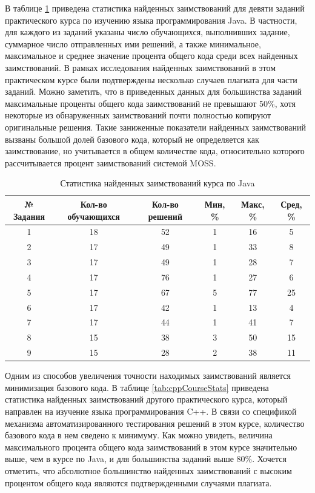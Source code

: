 \documentclass[a4paper,14pt]{extarticle}
\begin{document}
В таблице \ref{tab:javaCourseStats} приведена статистика найденных заимствований для девяти заданий практического курса по изучению языка программирования Java. В частности, для каждого из заданий указаны число обучающихся, выполнивших задание, суммарное число отправленных ими решений, а также минимальное, максимальное и среднее значение процента общего кода среди всех найденных заимствований. В рамках исследования найденных заимствований в этом практическом курсе были подтверждены несколько случаев плагиата для части заданий. Можно заметить, что в приведенных данных для большинства заданий максимальные проценты общего кода заимствований не превышают 50\%, хотя некоторые из обнаруженных заимствований почти полностью копируют оригинальные решения. Такие заниженные показатели найденных заимствований вызваны большой долей базового кода, который не определяется как заимствование, но учитывается в общем количестве кода, относительно которого рассчитывается процент заимствований системой MOSS.

\begin{table}[htb]
    \centering
    \begin{tabular}{cccccc}
        \toprule
        № Задания & Кол-во обучающихся & Кол-во решений & Мин, \% & Макс, \% & Сред, \% \\
        \toprule
        1 & 18 & 52 & 1 & 16 & 5 \\
        \midrule
        2 & 17 & 49 & 1 & 33 & 8 \\
        \midrule
        3 & 17 & 49 & 1 & 28 & 7 \\
        \midrule
        4 & 17 & 76 & 1 & 27 & 6 \\
        \midrule
        5 & 17 & 67 & 5 & 77 & 25 \\
        \midrule
        6 & 17 & 42 & 1 & 13 & 4 \\
        \midrule
        7 & 17 & 44 & 1 & 41 & 7 \\
        \midrule
        8 & 15 & 38 & 3 & 50 & 15 \\
        \midrule
        9 & 15 & 28 & 2 & 38 & 11 \\
        \bottomrule
    \end{tabular}
    \caption{Статистика найденных заимствований курса по Java}
    \label{tab:javaCourseStats}
\end{table}

Одним из способов увеличения точности находимых заимствований является минимизация базового кода. В таблице \ref{tab:cppCourseStats} приведена статистика найденных заимствований другого практического курса, который направлен на изучение языка программирования C++. В связи со спецификой механизма автоматизированного тестирования решений в этом курсе, количество базового кода в нем сведено к минимуму. Как можно увидеть, величина максимального процента общего кода заимствований в этом курсе значительно выше, чем в курсе по Java, и для большинства заданий выше 80\%. Хочется отметить, что абсолютное большинство найденных заимствований с высоким процентом общего кода являются подтвержденными случаями плагиата.
\end{document}
